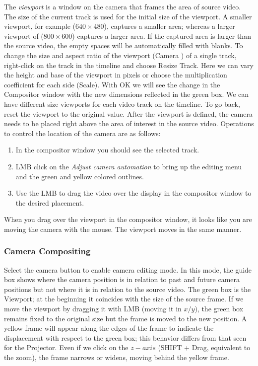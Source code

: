 The \textit{viewport} is a window on the camera that frames the area of source video. The size of the current track is used for the initial size of the viewport. A smaller viewport, for example ($640\times480$), captures a smaller area; whereas a larger viewport of ($800\times600$) captures a larger area.  If the captured area is larger than the source video, the empty spaces will be automatically filled with blanks.  To change the size and aspect ratio of the viewport (Camera ) of a single track, right-click on the track in the timeline and choose Resize Track. Here we can vary the height and base of the viewport in pixels or choose the multiplication coefficient for each side (Scale). With OK we will see the change in the Compositor window with the new dimensions reflected in the green box. We can have different size viewports for each video track on the timeline. To go back, reset the viewport to the original value. After the viewport is defined, the camera needs to be placed right above the area of interest in the source video. Operations to control the location of the camera are as follows:

\begin{enumerate}
    \item  In the compositor window you should see the selected track.
    \item  LMB click on the \textit{Adjust camera automation} to bring up the editing menu and the 
green and yellow colored outlines.
    \item  Use the LMB to drag the video over the display in the compositor window to the desired
placement.
\end{enumerate}

When you drag over the viewport in the compositor window, it looks like you are moving the camera
with the mouse.  The viewport moves in the same manner.

\subsubsection*{Camera Compositing}%
\label{ssub:camera_compositing}

Select the camera button to enable camera editing mode. 
In this mode, the guide box shows where the camera position is in relation to past and future camera positions but not where it is in relation to the source video. 
The green box is the Viewport; at the beginning it coincides with the size of the source frame. If we move the viewport by dragging it with LMB (moving it in $x/y$), the green box remains fixed to the original size but the frame is moved to the new position.  A yellow frame will appear along the edges of the frame to indicate the displacement with respect to the green box; this behavior differs from that seen for the Projector. Even if we click on the $z-axis$ (SHIFT + Drag, equivalent to the zoom), the frame narrows or widens, moving behind the yellow frame.

